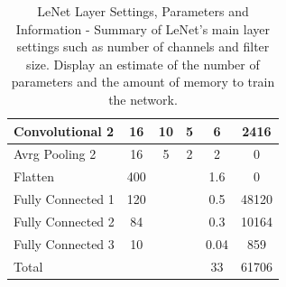 \begin{center}
\begin{table}[]
\begin{tabular}{|l|c|c|c|c|c|}
Convolutional 2   & 16                                                           & 10                                                              & 5                                                           & 6                                                              & 2416                \\ \hline
Avrg Pooling 2    & 16                                                           & 5                                                               & 2                                                           & 2                                                              & 0                   \\ \hline
Flatten           & 400                                                          &                                                                 &                                                             & 1.6                                                            & 0                   \\ \hline
Fully Connected 1 & 120                                                          &                                                                 &                                                             & 0.5                                                            & 48120               \\ \hline
Fully Connected 2 & 84                                                           &                                                                 &                                                             & 0.3                                                            & 10164               \\ \hline
Fully Connected 3 & 10                                                           &                                                                 &                                                             & 0.04                                                           & 859                 \\ \hline
Total             &                                                              &                                                                 &                                                             & 33                                                             & 61706               \\ \hline
\end{tabular}
\caption{LeNet Layer Settings, Parameters and Information - Summary of LeNet's main layer settings such as number of channels and filter size. Display an estimate of the number of parameters and the amount of memory to train the network.}

\label{table:tablelenet}
\end{table}
\end{center}

